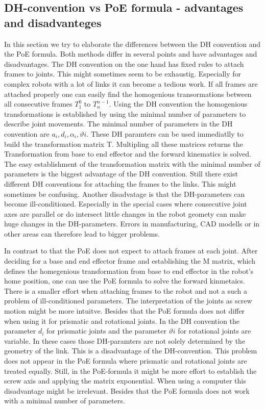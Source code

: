 \documentclass{tpk4170report}
\begin{document}
\subsection{DH-convention vs PoE formula - advantages and disadvanteges}
In this section we try to elaborate the differences between the DH convention and the PoE formula. Both methods differ in several points and have advantages and disadvantages. The DH convention on the one hand has fixed rules to attach frames to joints. This might sometimes seem to be exhaustig. Especially for complex robots with a lot of links it can become a tedious work. If all frames are attached properly one can easily find the homogenious transormations between all consecutive frames \(T_{1}^{0}\) to \(T_{n}^{n-1}\). Using the DH convention the homogenious transformations is established by using the minimal number of parameters to describe joint movements. The minimal number of parameters in the DH convention are  \(a_{i}, d_{i}, \alpha_{i}, \vartheta{i}\). These DH paramters can be used immediatlly to build the transformation matrix T. Multipling all these matrices returns the Transformation from base to end effector and the forward kinematics is solved. The easy establishment of the transformation matrix with the minimal number of parameters is the biggest advantage of the DH convention. Still there exist different DH conventions for attaching the frames to the links. This might sometimes be confusing. Another disadvatage is that the DH-parameters can become ill-conditioned. Especially in the special cases where consecutive joint axes are parallel or do intersect little changes in the robot geomety can make huge changes in the DH-parameters. Errors in manufacturing, CAD modells or in other areas can therefore lead to bigger problems. 

In contrast to that the PoE does not expect to attach frames at each joint. After deciding for a base and end effector frame and   establishing the M matrix, which defines the homegenious transformation from base to end effector in the robot's home position, one can use the PoE formula to solve the forward kinmetaics. There is a smaller effort when attaching frames to the robot and not a such a problem of ill-conditioned parameters. The interpretation of the joints as screw motion might be more intuitve. Besides that the PoE formula does not differ when using it for prismatic and rotational joints. In the DH convention the parameter \(d_{i}\) for prismatic joints and the parameter \(\vartheta{i}\) for rotational joints are variable. In these cases those DH-paramters are not solely determined by the geometry of the link. This is a disadvantage of the DH-convention. This problem does not appear in the PoE formula where prismatic and rotational joints are treated equally. Still, in the PoE-formula it might be more effort to establish the screw axis and applying the matrix exponential. When using a computer this disadvantage might be irrelevant. Besides that the PoE formula does not work with a minimal number of parameters. 
\end{document}
